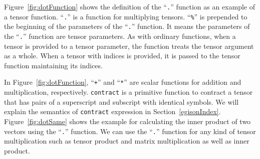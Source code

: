 \documentclass[acmlarge]{acmart}
\begin{document}
Figure~\ref{fig:dotFunction} shows the definition of the ``\texttt{.}'' function as an example of a tensor function.
``\texttt{.}'' is a function for multiplying tensors.
``\texttt{\%}'' is prepended to the beginning of the parameters of the ``\texttt{.}'' function.
It means the parameters of the ``\texttt{.}'' function are tensor parameters.
As with ordinary functions, when a tensor is provided to a tensor parameter, the function treats the tensor argument as a whole.
When a tensor with indices is provided, it is passed to the tensor function maintaining its indices.

In Figure~\ref{fig:dotFunction}, ``\texttt{+}'' and ``\texttt{*}'' are scalar functions for addition and multiplication, respectively.
\texttt{contract} is a primitive function to contract a tensor that has pairs of a superscript and subscript with identical symbols.
We will explain the semantics of \texttt{contract} expression in Section~\ref{egisonIndex}.
Figure~\ref{fig:dotSame} shows the example for calculating the inner product of two vectors using the ``\texttt{.}'' function.
We can use the ``\texttt{.}'' function for any kind of tensor multiplication such as tensor product and matrix multiplication as well as inner product.
\end{document}

